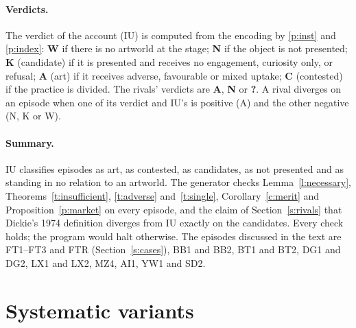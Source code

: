 \documentclass{situationist-preprint}
\begin{document}
\paragraph{Verdicts.} The verdict of the account (IU) is computed from the encoding by \ref{p:inst} and \ref{p:index}: \textbf{W} if there is no artworld at the stage; \textbf{N} if the object is not presented; \textbf{K} (candidate) if it is presented and receives no engagement, curiosity only, or refusal; \textbf{A} (art) if it receives adverse, favourable or mixed uptake; \textbf{C} (contested) if the practice is divided. The rivals' verdicts are \textbf{A}, \textbf{N} or \textbf{?}. A rival diverges on an episode when one of its verdict and IU's is positive (A) and the other negative (N, K or W).

\paragraph{Summary.} IU classifies \stvA{} episodes as art, \stvC{} as contested, \stvK{} as candidates, \stvN{} as not presented and \stvW{} as standing in no relation to an artworld. The generator checks Lemma~\ref{l:necessary}, Theorems~\ref{t:insufficient}, \ref{t:adverse} and~\ref{t:single}, Corollary~\ref{c:merit} and Proposition~\ref{p:market} on every episode, and the claim of Section~\ref{s:rivals} that Dickie's 1974 definition diverges from IU exactly on the candidates. Every check holds; the program would halt otherwise. The episodes discussed in the text are FT1--FT3 and FTR (Section~\ref{s:cases}), BB1 and BB2, BT1 and BT2, DG1 and DG2, LX1 and LX2, MZ4, AI1, YW1 and SD2.

{\small

}

\section{Systematic variants}\label{app:variants}
\end{document}
